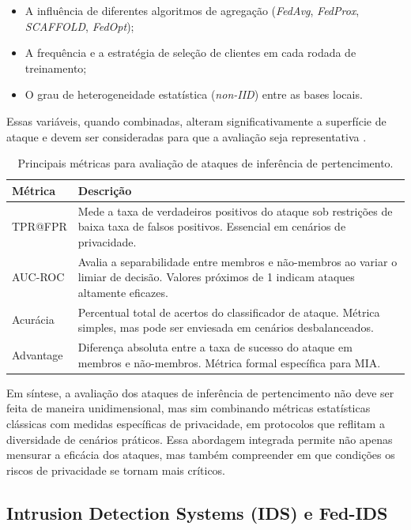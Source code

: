 \documentclass[
	12pt,				%
	openright,			%
	oneside,			%
	a4paper,			%
	english,			%
	french,				%
	spanish,			%
	brazil,				%
	]{abntex2}
\begin{document}
\begin{itemize}
    \item A influência de diferentes algoritmos de agregação (\textit{FedAvg}, \textit{FedProx}, \textit{SCAFFOLD}, \textit{FedOpt});
    \item A frequência e a estratégia de seleção de clientes em cada rodada de treinamento;
    \item O grau de heterogeneidade estatística (\textit{non-IID}) entre as bases locais.
\end{itemize}

Essas variáveis, quando combinadas, alteram significativamente a superfície de ataque e devem ser consideradas para que a avaliação seja representativa \cite{nasr2019comprehensive,bai2024survey}.


\begin{table}[H]
\centering
\caption{Principais métricas para avaliação de ataques de inferência de pertencimento.}
\begin{tabular}{|p{3cm}|p{9cm}|}
\hline
\textbf{Métrica} & \textbf{Descrição} \\ \hline
TPR@FPR & Mede a taxa de verdadeiros positivos do ataque sob restrições de baixa taxa de falsos positivos. Essencial em cenários de privacidade. \\ \hline
AUC-ROC & Avalia a separabilidade entre membros e não-membros ao variar o limiar de decisão. Valores próximos de 1 indicam ataques altamente eficazes. \\ \hline
Acurácia & Percentual total de acertos do classificador de ataque. Métrica simples, mas pode ser enviesada em cenários desbalanceados. \\ \hline
Advantage & Diferença absoluta entre a taxa de sucesso do ataque em membros e não-membros. Métrica formal específica para MIA. \\ \hline
\end{tabular}
\label{tab:mia_metrics}
\end{table}

Em síntese, a avaliação dos ataques de inferência de pertencimento não deve ser feita de maneira unidimensional, mas sim combinando métricas estatísticas clássicas com medidas específicas de privacidade, em protocolos que reflitam a diversidade de cenários práticos. Essa abordagem integrada permite não apenas mensurar a eficácia dos ataques, mas também compreender em que condições os riscos de privacidade se tornam mais críticos.

\subsection{Intrusion Detection Systems (IDS) e Fed-IDS}
\label{subsec:ids_fedids}
\end{document}
